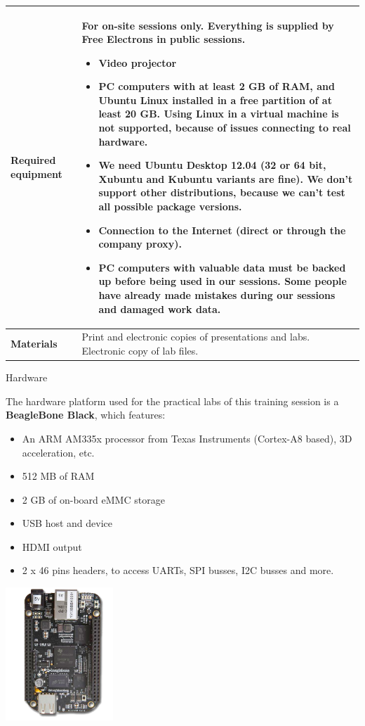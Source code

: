 \documentclass[a4paper,12pt,obeyspaces,spaces,hyphens]{article}
\begin{document}
{\begin{tabularx}{\textwidth}{|g|h|}
    {\bf Required equipment} &
    {\bf For on-site sessions only.}
    \newline Everything is supplied by Free Electrons in public sessions.
    \begin{itemize}
    \item Video projector
    \item PC computers with at least 2 GB of RAM, and Ubuntu Linux
    installed in a {\bf free partition of at least 20 GB. Using Linux
      in a virtual machine is not supported}, because of issues
    connecting to real hardware.
    \item We need Ubuntu Desktop 12.04 (32 or 64 bit, Xubuntu and
    Kubuntu variants are fine). We don't support other
    distributions, because we can't test all possible package versions.
    \item {\bf Connection to the Internet} (direct or through the
    company proxy).
    \item {\bf PC computers with valuable data must be backed up}
    before being used in our sessions.  Some people have already made
    mistakes during our sessions and damaged work data.
    \end{itemize} \\
    \hline

    {\bf Materials} & Print and electronic copies of presentations and
    labs.
    \newline Electronic copy of lab files.\\
    \hline

\end{tabularx}}
\normalsize

\feagendatwocolumn
{Hardware}
{
  The hardware platform used for the practical labs of this training
  session is a {\bf BeagleBone Black}, which features:

  \begin{itemize}
  \item An ARM AM335x processor from Texas Instruments (Cortex-A8
    based), 3D acceleration, etc.
  \item 512 MB of RAM
  \item 2 GB of on-board eMMC storage
  \item USB host and device
  \item HDMI output
  \item 2 x 46 pins headers, to access UARTs, SPI busses, I2C busses
    and more.
  \end{itemize}
}
{}
{
  \begin{center}
    \includegraphics[height=5cm]{agenda/beagleboneblack.png}
  \end{center}
}
\end{document}
